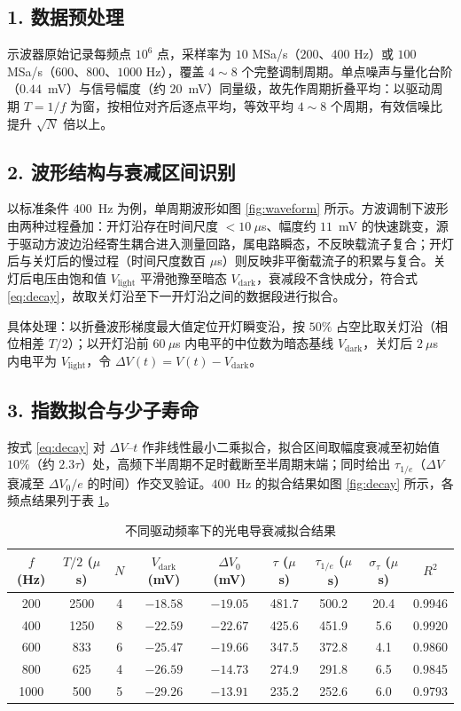 \documentclass[12pt,a4paper]{ctexart}
\begin{document}
\subsection*{1. 数据预处理}
示波器原始记录每频点 $10^6$ 点，采样率为 $10$ MSa/s（$200$、$400$ Hz）或 $100$ MSa/s（$600$、$800$、$1000$ Hz），覆盖 $4\sim8$ 个完整调制周期。单点噪声与量化台阶（$0.44$~mV）与信号幅度（约 $20$~mV）同量级，故先作周期折叠平均：以驱动周期 $T=1/f$ 为窗，按相位对齐后逐点平均，等效平均 $4\sim8$ 个周期，有效信噪比提升 $\sqrt{N}$ 倍以上。

\subsection*{2. 波形结构与衰减区间识别}
以标准条件 $400$~Hz 为例，单周期波形如图 \ref{fig:waveform} 所示。方波调制下波形由两种过程叠加：开灯沿存在时间尺度 $<10~\mu$s、幅度约 $11$~mV 的快速跳变，源于驱动方波边沿经寄生耦合进入测量回路，属电路瞬态，不反映载流子复合；开灯后与关灯后的慢过程（时间尺度数百 $\mu$s）则反映非平衡载流子的积累与复合。关灯后电压由饱和值 $V_{\mathrm{light}}$ 平滑弛豫至暗态 $V_{\mathrm{dark}}$，衰减段不含快成分，符合式 \eqref{eq:decay}，故取关灯沿至下一开灯沿之间的数据段进行拟合。

具体处理：以折叠波形梯度最大值定位开灯瞬变沿，按 $50\%$ 占空比取关灯沿（相位相差 $T/2$）；以开灯沿前 $60~\mu$s 内电平的中位数为暗态基线 $V_{\mathrm{dark}}$，关灯后 $2~\mu$s 内电平为 $V_{\mathrm{light}}$，令 $\Delta V(t)=V(t)-V_{\mathrm{dark}}$。

\subsection*{3. 指数拟合与少子寿命}
按式 \eqref{eq:decay} 对 $\Delta V$--$t$ 作非线性最小二乘拟合，拟合区间取幅度衰减至初始值 $10\%$（约 $2.3\tau$）处，高频下半周期不足时截断至半周期末端；同时给出 $\tau_{1/e}$（$\Delta V$ 衰减至 $\Delta V_0/e$ 的时间）作交叉验证。$400$~Hz 的拟合结果如图 \ref{fig:decay} 所示，各频点结果列于表 \ref{tab:tau}。

\begin{table}[htbp]
\centering\small
\caption{不同驱动频率下的光电导衰减拟合结果}
\label{tab:tau}
\begin{tabular}{ccccccccc}
\toprule
$f$ (Hz) & $T/2$ ($\mu$s) & $N$ & $V_{\mathrm{dark}}$ (mV) & $\Delta V_0$ (mV) & $\tau$ ($\mu$s) & $\tau_{1/e}$ ($\mu$s) & $\sigma_\tau$ ($\mu$s) & $R^2$\\
\midrule
200  & 2500 & 4 & $-18.58$ & $-19.05$ & 481.7 & 500.2 & 20.4 & 0.9946\\
400  & 1250 & 8 & $-22.59$ & $-22.67$ & 425.6 & 451.9 & 5.6  & 0.9920\\
600  & 833  & 6 & $-25.47$ & $-19.66$ & 347.5 & 372.8 & 4.1  & 0.9860\\
800  & 625  & 4 & $-26.59$ & $-14.73$ & 274.9 & 291.8 & 6.5  & 0.9845\\
1000 & 500  & 5 & $-29.26$ & $-13.91$ & 235.2 & 252.6 & 6.0  & 0.9793\\
\bottomrule
\end{tabular}
\end{table}
\end{document}
